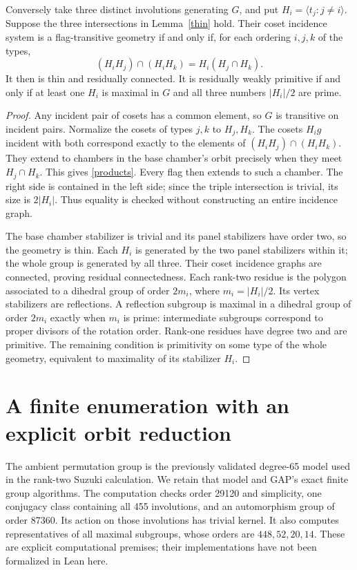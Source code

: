 \documentclass[11pt,a4paper]{article}
\begin{document}
\begin{lemma}\label{recognize}
Conversely take three distinct involutions generating $G$, and put
$H_i=\langle t_j:j\ne i\rangle$. Suppose the three intersections in
Lemma~\ref{thin} hold. Their coset incidence system is a flag-transitive
geometry if and only if, for each ordering $i,j,k$ of the types,
\begin{equation}\label{products}
        (H_iH_j)\cap(H_iH_k)=H_i(H_j\cap H_k).
\end{equation}
It then is thin and residually connected. It is residually weakly primitive
if and only if at least one $H_i$ is maximal in $G$ and all three numbers
$|H_i|/2$ are prime.
\end{lemma}
\begin{proof}
Any incident pair of cosets has a common element, so $G$ is transitive
on incident pairs. Normalize the cosets of types $j,k$ to $H_j,H_k$.
The cosets $H_i g$ incident with both correspond exactly to the elements
of $(H_iH_j)\cap(H_iH_k)$. They extend to chambers in the base chamber's
orbit precisely when they meet $H_j\cap H_k$. This gives
\eqref{products}. Every flag then extends to such a chamber. The right
side is contained in the left side; since the triple intersection is
trivial, its size is $2|H_i|$. Thus equality is checked without constructing
an entire incidence graph.

The base chamber stabilizer is trivial and its panel stabilizers have
order two, so the geometry is thin. Each $H_i$ is generated by the two
panel stabilizers within it; the whole group is generated by all three.
Their coset incidence graphs are connected, proving residual connectedness.
Each rank-two residue is the polygon associated to a dihedral group of
order $2m_i$, where $m_i=|H_i|/2$. Its vertex stabilizers are reflections.
A reflection subgroup is maximal in a dihedral group of order $2m_i$
exactly when $m_i$ is prime: intermediate subgroups correspond to proper
divisors of the rotation order. Rank-one residues have degree two and
are primitive. The remaining condition is primitivity on some type of
the whole geometry, equivalent to maximality of its stabilizer $H_i$.
\end{proof}

\section*{A finite enumeration with an explicit orbit reduction}
The ambient permutation group is the previously validated degree-65 model
used in the rank-two Suzuki calculation. We retain that model and GAP's
exact finite group algorithms. The computation checks order 29120 and
simplicity, one conjugacy class containing all 455 involutions, and an
automorphism group of order 87360. Its action on those involutions has
trivial kernel. It also computes representatives of all maximal subgroups,
whose orders are $448,52,20,14$. These are explicit computational premises;
their implementations have not been formalized in Lean here.
\end{document}
